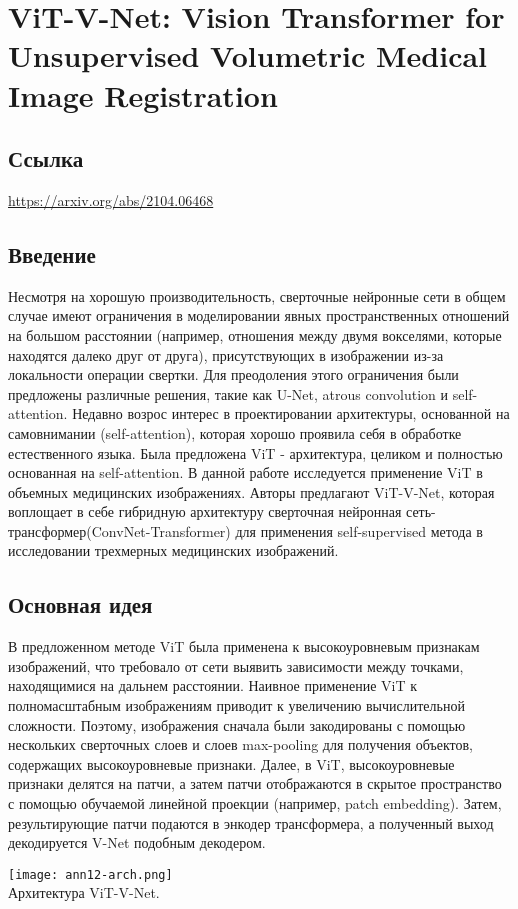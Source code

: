 \section{ViT-V-Net: Vision Transformer for Unsupervised Volumetric Medical Image Registration}

\subsection*{Ссылка} \url{https://arxiv.org/abs/2104.06468}
\subsection*{Введение}
Несмотря на хорошую производительность, сверточные нейронные сети
в общем случае имеют  ограничения в моделировании явных
пространственных отношений на большом расстоянии (например, 
отношения между двумя вокселями, которые находятся далеко друг от друга), 
присутствующих в изображении из-за локальности операции свертки.
Для преодоления этого ограничения были предложены различные решения, такие как 
U-Net, atrous convolution и self-attention. Недавно возрос интерес 
в проектировании архитектуры, основанной на самовнимании (self-attention), 
которая хорошо проявила себя в обработке естественного языка. Была 
предложена ViT - архитектура, целиком и полностью основанная на self-attention.
В данной работе исследуется применение ViT в объемных медицинских изображениях.
Авторы предлагают ViT-V-Net, которая воплощает в себе гибридную архитектуру
\glqq сверточная нейронная сеть-трансформер\grqq (ConvNet-Transformer) для применения self-supervised 
метода в исследовании трехмерных медицинских изображений.
\subsection*{Основная идея}
В предложенном методе ViT была применена к высокоуровневым признакам изображений, что
требовало от сети выявить зависимости между точками, находящимися на дальнем расстоянии.
Наивное применение ViT к полномасштабным изображениям приводит к увеличению вычислительной 
сложности. Поэтому, изображения сначала были закодированы с помощью
нескольких сверточных слоев и слоев max-pooling для получения объектов,
содержащих высокоуровневые признаки. Далее, в ViT, высокоуровневые признаки делятся на патчи, 
а затем патчи отображаются в скрытое пространство с помощью обучаемой 
линейной проекции (например, patch embedding). Затем, результирующие патчи 
подаются в энкодер трансформера, а полученный выход декодируется V-Net подобным декодером. 
\\
\begin{minipage}{1.0\linewidth}
    \begin{center}
        \texttt{[image: ann12-arch.png]} \\
        \caption{\scriptsize{Архитектура ViT-V-Net.}}
    \end{center}
    
\end{minipage}
